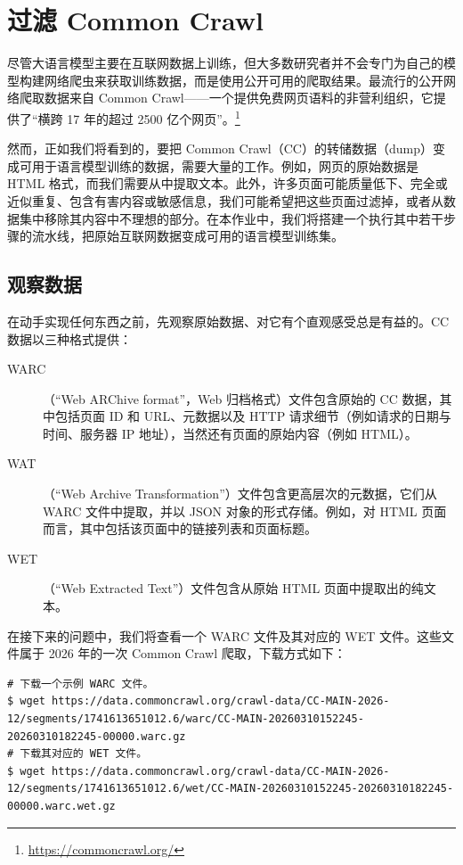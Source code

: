 \section{过滤 Common Crawl}

尽管大语言模型主要在互联网数据上训练，但大多数研究者并不会专门为自己的模型构建网络爬虫来获取训练数据，而是使用公开可用的爬取结果。最流行的公开网络爬取数据来自 Common Crawl——一个提供免费网页语料的非营利组织，它提供了“横跨 17 年的超过 2500 亿个网页”。\footnote{\url{https://commoncrawl.org/}}

然而，正如我们将看到的，要把 Common Crawl（CC）的转储数据（dump）变成可用于语言模型训练的数据，需要大量的工作。例如，网页的原始数据是 HTML 格式，而我们需要从中提取文本。此外，许多页面可能质量低下、完全或近似重复、包含有害内容或敏感信息，我们可能希望把这些页面过滤掉，或者从数据集中移除其内容中不理想的部分。在本作业中，我们将搭建一个执行其中若干步骤的流水线，把原始互联网数据变成可用的语言模型训练集。

\subsection{观察数据}

在动手实现任何东西之前，先观察原始数据、对它有个直观感受总是有益的。CC 数据以三种格式提供：
\begin{description}
  \item[WARC] （“Web ARChive format”，Web 归档格式）文件包含原始的 CC 数据，其中包括页面 ID 和 URL、元数据以及 HTTP 请求细节（例如请求的日期与时间、服务器 IP 地址），当然还有页面的原始内容（例如 HTML）。
  \item[WAT] （“Web Archive Transformation”）文件包含更高层次的元数据，它们从 WARC 文件中提取，并以 JSON 对象的形式存储。例如，对 HTML 页面而言，其中包括该页面中的链接列表和页面标题。
  \item[WET] （“Web Extracted Text”）文件包含从原始 HTML 页面中提取出的纯文本。
\end{description}

在接下来的问题中，我们将查看一个 WARC 文件及其对应的 WET 文件。这些文件属于 2026 年的一次 Common Crawl 爬取，下载方式如下：

\begin{lstlisting}
# 下载一个示例 WARC 文件。
$ wget https://data.commoncrawl.org/crawl-data/CC-MAIN-2026-12/segments/1741613651012.6/warc/CC-MAIN-20260310152245-20260310182245-00000.warc.gz
# 下载其对应的 WET 文件。
$ wget https://data.commoncrawl.org/crawl-data/CC-MAIN-2026-12/segments/1741613651012.6/wet/CC-MAIN-20260310152245-20260310182245-00000.warc.wet.gz
\end{lstlisting}

